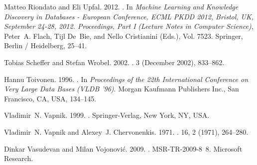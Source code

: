 \begin{thebibliography}{00}
{Matteo Riondato} {and} {Eli Upfal}. 2012.
\newblock {}. In
  {\em Machine Learning and Knowledge Discovery in Databases - European
  Conference, ECML PKDD 2012, Bristol, UK, September 24-28, 2012. Proceedings,
  Part I} {\em (Lecture Notes in Computer Science)}, {Peter~A. Flach}, {Tijl
  De~Bie}, {and} {Nello Cristianini} (Eds.), Vol. 7523. Springer, Berlin /
  Heidelberg, 25--41.


{Tobias Scheffer} {and} {Stefan Wrobel}. 2002.
\newblock {}.
  {3} (December 2002), 833--862.


{Hannu Toivonen}. 1996.
\newblock {}. In
  {\em Proceedings of the 22th International Conference on Very Large Data
  Bases} {\em (VLDB '96)}. Morgan Kaufmann Publishers Inc., San Francisco, CA,
  USA, 134--145.


{Vladimir~N. Vapnik}. 1999.
.
\newblock Springer-Verlag, New York, NY, USA.


{Vladimir~N. Vapnik} {and} {Alexey~J. Chervonenkis}. 1971.
\newblock {}.
 {16}, 2 (1971),
  264--280.


{Dinkar Vasudevan} {and} {Milan Vojonovi\'{c}}. 2009.
.
\newblock MSR-TR-2009-8~8. Microsoft Research.



\end{thebibliography}
